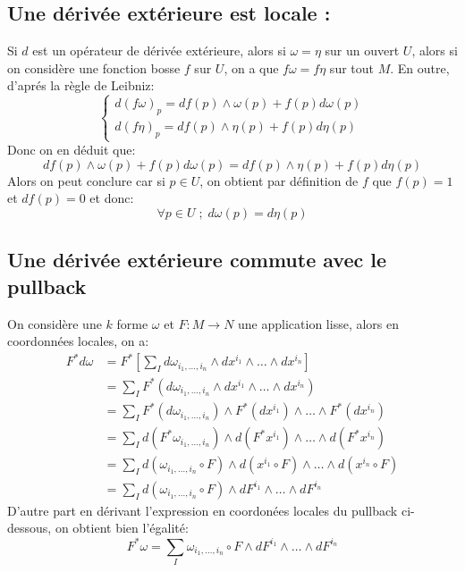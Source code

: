    \subsection*{Une dérivée extérieure est locale {:}}
      Si \( d \) est un opérateur de dérivée extérieure, alors si \( \omega = \eta \) sur un ouvert \( U \), alors si on considère une fonction bosse \( f \) sur \( U \), on a que \( f \omega = f \eta \) sur tout \(M\). En outre, d'aprés la règle de Leibniz:
      \[ 
         \begin{cases}
            d(f \omega)_p = df(p) \wedge \omega(p) + f(p)d\omega(p)\\
            d(f \eta)_p = df(p) \wedge \eta(p) + f(p)d\eta(p)
         \end{cases}
      \]
      Donc on en déduit que:
      \[ 
         df(p) \wedge \omega(p) + f(p)d\omega(p) = df(p) \wedge \eta(p) + f(p)d\eta(p)
      \]
      Alors on peut conclure car si \( p \in U \), on obtient par définition de \( f \) que \( f(p) = 1 \) et \( df(p) = 0 \) et donc:
      \[ 
         \forall p \in U \; ; \; d\omega(p) = d\eta(p)
      \]
   \subsection*{Une dérivée extérieure commute avec le pullback}
      On considère une $k$ forme $\omega$ et \( F : M \longrightarrow N \) une application lisse,  alors en coordonnées locales, on a:
      \begin{align*}
         F^*d\omega &= F^*\left[\sum_{I} d\omega_{i_1, \ldots, i_n} \wedge dx^{i_1} \wedge \ldots \wedge dx^{i_n}\right]\\
         &= \sum_{I} F^*(d\omega_{i_1, \ldots, i_n} \wedge dx^{i_1}  \wedge \ldots \wedge dx^{i_n})\\
         &= \sum_{I} F^*(d\omega_{i_1, \ldots, i_n}) \wedge F^*(dx^{i_1})  \wedge \ldots \wedge F^*(dx^{i_n})\\
         &= \sum_{I} d(F^*\omega_{i_1, \ldots, i_n}) \wedge d(F^*x^{i_1})  \wedge \ldots \wedge d(F^*x^{i_n})\\
         &= \sum_{I} d(\omega_{i_1, \ldots, i_n} \circ F) \wedge d(x^{i_1} \circ F)  \wedge \ldots \wedge d(x^{i_n} \circ F)\\
         &= \sum_{I} d(\omega_{i_1, \ldots, i_n} \circ F) \wedge dF^{i_1}  \wedge \ldots \wedge  dF^{i_n}
      \end{align*}
      D'autre part en dérivant l'expression en coordonées locales du pullback ci-dessous, on obtient bien l'égalité:
      \[ 
         F^*\omega = \sum_{I} \omega_{i_1, \ldots, i_n} \circ F \wedge dF^{i_1}  \wedge \ldots \wedge  dF^{i_n}
      \]
